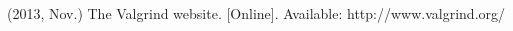 \documentclass[conference]{IEEEtran}
\begin{document}

%
%
%


\begin{thebibliography}{1}
% 
(2013, Nov.) The Valgrind website. [Online]. Available: http://www.valgrind.org/
% 
\end{thebibliography}




\end{document}
